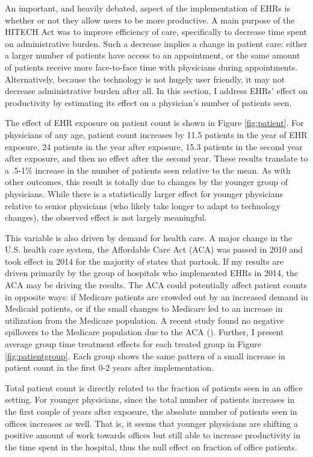 \documentclass[11pt]{article}
\begin{document}
An important, and heavily debated, aspect of the implementation of EHRs is whether or not they allow users to be more productive. A main purpose of the HITECH Act was to improve efficiency of care, specifically to decrease time spent on administrative burden. Such a decrease implies a change in patient care: either a larger number of patients have access to an appointment, or the same amount of patients receive more face-to-face time with physicians during appointments. Alternatively, because the technology is not hugely user friendly, it may not decrease administrative burden after all. In this section, I address EHRs' effect on productivity by estimating its effect on a physician's number of patients seen. 

The effect of EHR exposure on patient count is shown in Figure \ref{fig:patient}. For physicians of any age, patient count increases by 11.5 patients in the year of EHR exposure, 24 patients in the year after exposure, 15.3 patients in the second year after exposure, and then no effect after the second year. These results translate to a .5-1\% increase in the number of patients seen relative to the mean. As with other outcomes, this result is totally due to changes by the younger group of physicians. While there is a statistically larger effect for younger physicians relative to senior physicians (who likely take longer to adapt to technology changes), the observed effect is not largely meaningful. 

This variable is also driven by demand for health care. A major change in the U.S. health care system, the Affordable Care Act (ACA) was passed in 2010 and took effect in 2014 for the majority of states that partook. If my results are driven primarily by the group of hospitals who implemented EHRs in 2014, the ACA may be driving the results. The ACA could potentially affect patient counts in opposite ways: if Medicare patients are crowded out by an increased demand in Medicaid patients, or if the small changes to Medicare led to an increase in utilization from the Medicare population. A recent study found no negative spillovers to the Medicare population due to the ACA (\cite{carey2020impact}). Further, I present average group time treatment effects for each treated group in Figure \ref{fig:patientgroup}. Each group shows the same pattern of a small increase in patient count in the first 0-2 years after implementation. 

Total patient count is directly related to the fraction of patients seen in an office setting. For younger physicians, since the total number of patients increases in the first couple of years after exposure, the absolute number of patients seen in offices increases as well. That is, it seems that younger physicians are shifting a positive amount of work towards offices but still able to increase productivity in the time spent in the hospital, thus the null effect on fraction of office patients. 
\end{document}

